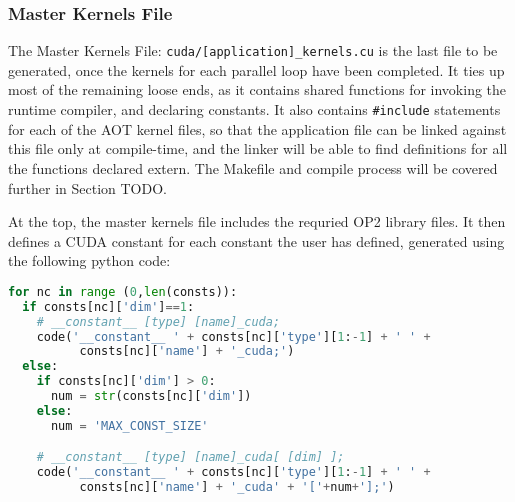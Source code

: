 \subsubsection{Master Kernels File}
The Master Kernels File: \verb|cuda/[application]_kernels.cu| is the last file to be generated, once the kernels for each parallel loop have been completed. It ties up most of the remaining loose ends, as it contains shared functions for invoking the runtime compiler, and declaring constants. It also contains \verb|#include| statements for each of the AOT kernel files, so that the application file can be linked against this file only at compile-time, and the linker will be able to find definitions for all the functions declared extern. The Makefile and compile process will be covered further in Section TODO.
\par
At the top, the master kernels file includes the requried OP2 library files. It then defines a CUDA constant for each constant the user has defined, generated using the following python code:
\begin{lstlisting}[backgroundcolor = \color{lightgray!20}, language=Python]
for nc in range (0,len(consts)):
  if consts[nc]['dim']==1:
    # __constant__ [type] [name]_cuda;
    code('__constant__ ' + consts[nc]['type'][1:-1] + ' ' +
          consts[nc]['name'] + '_cuda;')
  else:
    if consts[nc]['dim'] > 0:
      num = str(consts[nc]['dim'])
    else:
      num = 'MAX_CONST_SIZE'

    # __constant__ [type] [name]_cuda[ [dim] ];
    code('__constant__ ' + consts[nc]['type'][1:-1] + ' ' +
          consts[nc]['name'] + '_cuda' + '['+num+'];')
\end{lstlisting}
\vspace{-1em}
